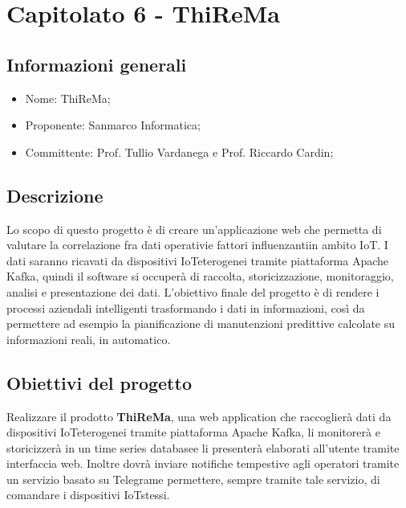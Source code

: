\section{Capitolato 6 - ThiReMa}
\subsection{Informazioni generali}
\begin{itemize}
	\item Nome: ThiReMa;
	\item Proponente: Sanmarco Informatica;
	\item Committente: Prof. Tullio Vardanega e Prof. Riccardo Cardin;
\end{itemize}
\subsection{Descrizione}
Lo scopo di questo progetto è di creare un'applicazione web che permetta di valutare la correlazione fra dati operativi\glosp e fattori influenzanti\glo in ambito IoT\glo. I dati saranno ricavati da dispositivi IoT\glosp eterogenei tramite piattaforma Apache Kafka\glo, quindi il software si occuperà di raccolta, storicizzazione, monitoraggio, analisi e presentazione dei dati.
L'obiettivo finale del progetto è di rendere i processi aziendali intelligenti trasformando i dati in informazioni, così da permettere ad esempio la pianificazione di manutenzioni predittive calcolate su informazioni reali, in automatico.

\subsection{Obiettivi del progetto}
Realizzare il prodotto \textbf{ThiReMa}, una web application che raccoglierà dati da dispositivi IoT\glosp eterogenei tramite piattaforma Apache Kafka, li monitorerà e storicizzerà in un time series database\glosp e li presenterà elaborati all'utente tramite interfaccia web. Inoltre dovrà inviare notifiche tempestive agli operatori tramite un servizio basato su Telegram\glo e permettere, sempre tramite tale servizio, di comandare i dispositivi IoT\glosp stessi.

